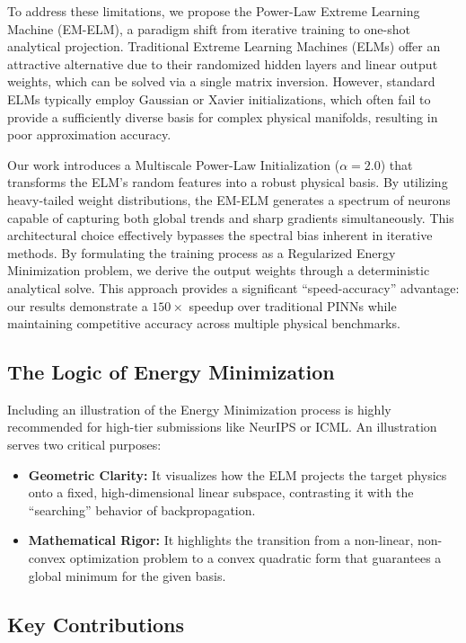 \documentclass[final,12pt,3p,times,fleqn]{elsarticle}
\begin{document}
To address these limitations, we propose the Power-Law Extreme Learning Machine (EM-ELM), a paradigm shift from iterative training to one-shot analytical projection. Traditional Extreme Learning Machines (ELMs) offer an attractive alternative due to their randomized hidden layers and linear output weights, which can be solved via a single matrix inversion. However, standard ELMs typically employ Gaussian or Xavier initializations, which often fail to provide a sufficiently diverse basis for complex physical manifolds, resulting in poor approximation accuracy.

Our work introduces a Multiscale Power-Law Initialization ($\alpha=2.0$) that transforms the ELM's random features into a robust physical basis. By utilizing heavy-tailed weight distributions, the EM-ELM generates a spectrum of neurons capable of capturing both global trends and sharp gradients simultaneously. This architectural choice effectively bypasses the spectral bias inherent in iterative methods. By formulating the training process as a Regularized Energy Minimization problem, we derive the output weights through a deterministic analytical solve. This approach provides a significant ``speed-accuracy'' advantage: our results demonstrate a $150\times$ speedup over traditional PINNs while maintaining competitive accuracy across multiple physical benchmarks.

\subsection{The Logic of Energy Minimization}

Including an illustration of the Energy Minimization process is highly recommended for high-tier submissions like NeurIPS or ICML. An illustration serves two critical purposes:
\begin{itemize}
    \item \textbf{Geometric Clarity:} It visualizes how the ELM projects the target physics onto a fixed, high-dimensional linear subspace, contrasting it with the ``searching'' behavior of backpropagation.
    \item \textbf{Mathematical Rigor:} It highlights the transition from a non-linear, non-convex optimization problem to a convex quadratic form that guarantees a global minimum for the given basis.
\end{itemize}

\subsection{Key Contributions}
\end{document}

